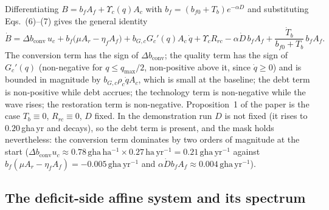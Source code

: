\documentclass[11pt,a4paper]{article}
\newcommand{\dconv}{\Delta b_{\mathrm{conv}}}
\newcommand{\Ups}{\Upsilon_c}
\begin{document}
Differentiating $B=b_fA_f+\Ups(q)A_c$ with $b_f=(b_{f0}+T_b)e^{-\alpha D}$ and substituting Eqs.~(6)--(7) gives the general identity
\begin{equation}\label{eq:si_identity}
\dot B=\dconv\,u_c+b_f\big(\mu A_r-\eta_fA_f\big)+b_{G,c}G_c'(q)A_c\,\dot q+\Ups R_{rc}-\alpha\dot D\,b_fA_f+\frac{\dot T_b}{b_{f0}+T_b}\,b_fA_f .
\end{equation}
The conversion term has the sign of $\dconv$; the quality term has the sign of $G_c'(q)$ (non-negative for $q\le q_{\max}/2$, non-positive above it, since $\dot q\ge0$) and is bounded in magnitude by $b_{G,c}\rho_c\dot qA_c$, which is small at the baseline; the debt term is non-positive while debt accrues; the technology term is non-negative while the wave rises; the restoration term is non-negative. Proposition~1 of the paper is the case $T_b\equiv0$, $R_{rc}\equiv0$, $D$ fixed. In the demonstration run $D$ is not fixed (it rises to $0.20$\,gha\,yr and decays), so the debt term is present, and the mask holds nevertheless: the conversion term dominates by two orders of magnitude at the start ($\dconv u_c\approx0.78\,\mathrm{gha\,ha^{-1}}\times0.27\,\mathrm{ha\,yr^{-1}}=0.21\,\mathrm{gha\,yr^{-1}}$ against $b_f(\mu A_r-\eta_fA_f)=-0.005\,\mathrm{gha\,yr^{-1}}$ and $\alpha\dot D b_fA_f\approx0.004\,\mathrm{gha\,yr^{-1}}$).

\subsection{The deficit-side affine system and its spectrum}\label{si:affine}
\end{document}
